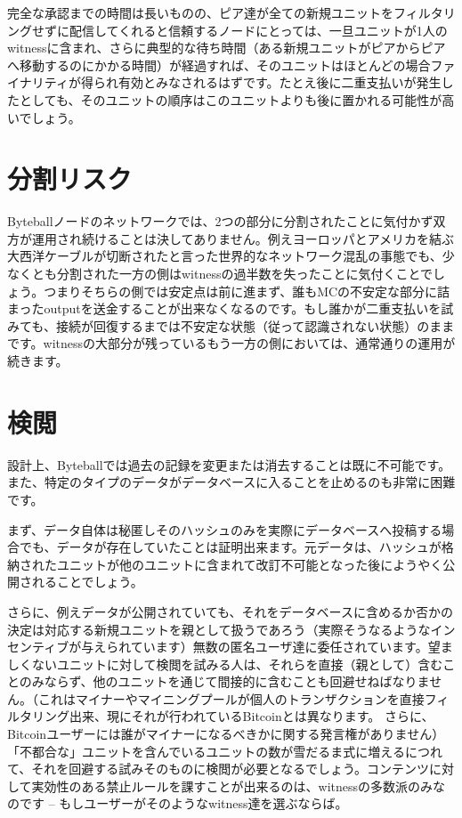 \documentclass[a4paper, dvipdfmx]{jsarticle}
\begin{document}
完全な承認までの時間は長いものの、ピア達が全ての新規ユニットをフィルタリングせずに配信してくれると信頼するノードにとっては、一旦ユニットが1人のwitnessに含まれ、さらに典型的な待ち時間（ある新規ユニットがピアからピアへ移動するのにかかる時間）が経過すれば、そのユニットはほとんどの場合ファイナリティが得られ有効とみなされるはずです。たとえ後に二重支払いが発生したとしても、そのユニットの順序はこのユニットよりも後に置かれる可能性が高いでしょう。

\section{分割リスク}
Byteballノードのネットワークでは、2つの部分に分割されたことに気付かず双方が運用され続けることは決してありません。例えヨーロッパとアメリカを結ぶ大西洋ケーブルが切断されたと言った世界的なネットワーク混乱の事態でも、少なくとも分割された一方の側はwitnessの過半数を失ったことに気付くことでしょう。つまりそちらの側では安定点は前に進まず、誰もMCの不安定な部分に詰まったoutputを送金することが出来なくなるのです。もし誰かが二重支払いを試みても、接続が回復するまでは不安定な状態（従って認識されない状態）のままです。witnessの大部分が残っているもう一方の側においては、通常通りの運用が続きます。

\section{検閲}
設計上、Byteballでは過去の記録を変更または消去することは既に不可能です。また、特定のタイプのデータがデータベースに入ることを止めるのも非常に困難です。

まず、データ自体は秘匿しそのハッシュのみを実際にデータベースへ投稿する場合でも、データが存在していたことは証明出来ます。元データは、ハッシュが格納されたユニットが他のユニットに含まれて改訂不可能となった後にようやく公開されることでしょう。

さらに、例えデータが公開されていても、それをデータベースに含めるか否かの決定は対応する新規ユニットを親として扱うであろう（実際そうなるようなインセンティブが与えられています）無数の匿名ユーザ達に委任されています。望ましくないユニットに対して検閲を試みる人は、それらを直接（親として）含むことのみならず、他のユニットを通じて間接的に含むことも回避せねばなりません。（これはマイナーやマイニングプールが個人のトランザクションを直接フィルタリング出来、現にそれが行われているBitcoinとは異なります。 さらに、Bitcoinユーザーには誰がマイナーになるべきかに関する発言権がありません） 「不都合な」ユニットを含んでいるユニットの数が雪だるま式に増えるにつれて、それを回避する試みそのものに検閲が必要となるでしょう。コンテンツに対して実効性のある禁止ルールを課すことが出来るのは、witnessの多数派のみなのです – もしユーザーがそのようなwitness達を選ぶならば。
\end{document}
